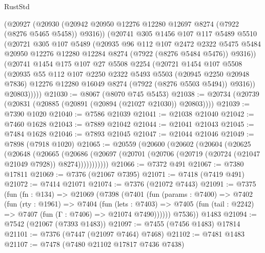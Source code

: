 \begin{lexlean}{RustStd}
\begin{coremodule}
        (@20927
          (@20930 (@20942 @20950 @12276 @12280 @12697 @8274 (@7922 (@8276 @5465 @5458)) @9316))
          (@20741
            @305
            @1456
            @107
            @117
            @5489
            @5510
            (@20721
              @305
              @107
              @5489
              (@20935
                @96
                @112
                @107
                @2472
                @2322
                @5475
                @5484
                @20950
                @12276
                @12280
                @12284
                @8274
                (@7922 (@8276 @5484 @5476))
                @9316))
            (@20741
              @1454
              @175
              @107
              @27
              @5508
              @2254
              (@20721
                @1454
                @107
                @5508
                (@20935
                  @55
                  @112
                  @107
                  @2250
                  @2322
                  @5493
                  @5503
                  (@20945 @2250 @20948 @7836)
                  @12276
                  @12280
                  @16049
                  @8274
                  (@7922 (@8276 @5503 @5494))
                  @9316))
              @20803)))))
@21030 := @8067 (@8070 @745 @5453)
@21038 := @20734 (@20739 (@20831 (@20885 (@20891 (@20894 (@21027 @21030)) @20803))))
@21039 := @7390 @1020
@21040 := @7586 @21039
@21041 := @21038 @21040
@21042 := @7460 @1628
@21043 := @7889 @21042
@21044 := @21041 @21043
@21045 := @7484 @1628
@21046 := @7893 @21045
@21047 := @21044 @21046
@21049 := @7898 (@7918 @1020)
@21065 := @20559
    (@20600
      (@20602
        (@20604
          (@20625
            (@20648
              (@20665
                (@20686
                  (@20697 (@20701 (@20706 (@20719 (@20724 (@21047 @21049 @7928)) @8274)))))))))))
@21066 := @7372 @491
@21067 := @7380 @17811
@21069 := @7376 (@21067 @7395)
@21071 := @7418 (@7419 @491)
@21072 := @7414 @21071
@21074 := @7376 (@21072 @7443)
@21091 := @7375
    (fun (fn : @134) =>
    @21069
      (@7398
        (@7401
          (fun (params : @7400) =>
          @7402
            (fun (rty : @1961) =>
            @7404
              (fun (lets : @7403) =>
              @7405 (fun (tail : @2242) => @7407 (fun (Γ : @7406) => @21074 @7490))))))
        @7536))
    @1483
@21094 := @7542 (@21067 (@7393 @1483))
@21097 := @7455 (@7456 @1483) @17814
@21101 := @7376 (@7447 (@21097 @7464) @7468)
@21102 := @7481 @1483
@21107 := @7478 (@7480 @21102 @17817 @7436 @7438)

\end{coremodule}
\end{lexlean}
